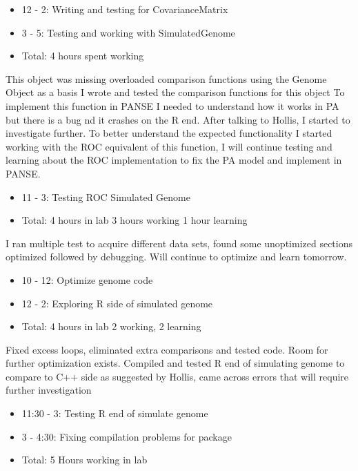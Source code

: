 \documentclass[12pt,hyperref]{labbook}
\begin{document}
\begin{itemize}
    \item 12 - 2: Writing and testing for CovarianceMatrix
    \item 3 - 5: Testing and working with SimulatedGenome
    \item Total: 4 hours spent working
\end{itemize}
This object was missing overloaded comparison functions using the Genome Object as a basis I wrote and tested the comparison functions for this object
To implement this function in PANSE I needed to understand how it works in PA but there is a bug nd it crashes on the R end. After talking to Hollis, I started to investigate further. To better understand the expected functionality I started working with the ROC equivalent of this function, I will continue testing and learning about the ROC implementation to fix the PA model and implement in PANSE.
\begin{itemize}
    \item 11 - 3: Testing ROC Simulated Genome
    \item Total: 4 hours in lab 3 hours working 1 hour learning
\end{itemize}
I ran multiple test to acquire different data sets, found some unoptimized sections optimized followed by debugging. Will continue to optimize and learn tomorrow.
\begin{itemize}
    \item 10 - 12: Optimize genome code
    \item 12 - 2: Exploring R side of simulated genome
    \item Total: 4 hours in lab 2 working, 2 learning
\end{itemize}
Fixed excess loops, eliminated extra comparisons and tested code. Room for further optimization exists.
Compiled and tested R end of simulating genome to compare to C++ side as suggested by Hollis, came across errors 
that will require further investigation
\begin{itemize}
    \item 11:30 - 3: Testing R end of simulate genome
    \item 3 - 4:30: Fixing compilation problems for package
    \item Total: 5 Hours working in lab
\end{itemize}
\end{document}
